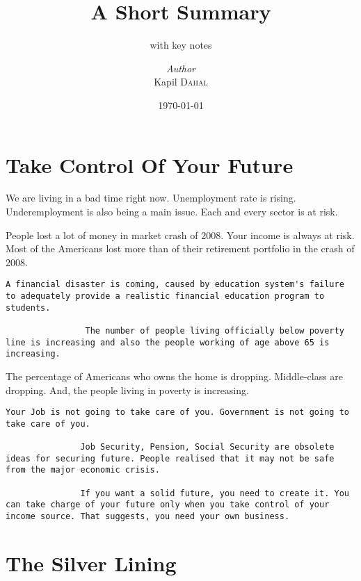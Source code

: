 \documentclass[a4paper, 12pt]{report}
\institute{The Business of $21^{st}$ century}
\title{A Short Summary}
\subtitle{with key notes}
\author{\textit{Author}\\Kapil \textsc{Dahal}}
\date{\today}
\begin{document}
    \maketitle
    \romantableofcontents

    \chapter{Take Control Of Your Future}

    We are living in a bad time right now. Unemployment rate is rising. Underemployment is also being a main issue. Each and every sector is at risk.
    
    People lost a lot of money in market crash of 2008. Your income is always at risk. Most of the Americans lost more than of their retirement portfolio in the crash of 2008.  



    \begin{lstlisting}[style=latexFrameTB]
                A financial disaster is coming, caused by education system's failure to adequately provide a realistic financial education program to students.
                
                The number of people living officially below poverty line is increasing and also the people working of age above 65 is increasing.
    \end{lstlisting}
    
    The percentage of Americans who owns the home is dropping. Middle-class are dropping. And, the people living in poverty is increasing.
    
    \begin{lstlisting}[style=latexFrameTB]
               Your Job is not going to take care of you. Government is not going to take care of you.
               
               Job Security, Pension, Social Security are obsolete ideas for securing future. People realised that it may not be safe from the major economic crisis.
               
               If you want a solid future, you need to create it. You can take charge of your future only when you take control of your income source. That suggests, you need your own business.
    \end{lstlisting}


    \chapter{The Silver Lining }
\end{document}
